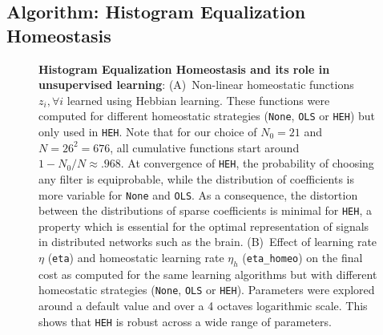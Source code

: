 \documentclass[vision,article,submit,oneauthor,pdftex]{Definitions/mdpi}
\newcommand{\seeFig}[1]{Figure~\ref{fig:#1}}%
\begin{document}
\subsection{Algorithm: Histogram Equalization Homeostasis}\label{HEH}
\begin{figure}%
\caption{
{\bf Histogram Equalization Homeostasis and its role in unsupervised learning}:
{\sf (A)}~Non-linear homeostatic functions $z_i, \forall i$ learned using Hebbian learning. These functions were computed for different homeostatic strategies (\texttt{None}, \texttt{OLS} or \texttt{HEH}) but only used in \texttt{HEH}. Note that for our choice of $N_0=21$ and $N=26^2=676$, all cumulative functions start around $1 - N_0/N \approx .968 $. At convergence of \texttt{HEH}, the probability of choosing any filter is equiprobable, while the distribution of coefficients is more variable for \texttt{None} and \texttt{OLS}. As a consequence, the distortion between the distributions of sparse coefficients is minimal for \texttt{HEH}, a property which is essential for the optimal representation of signals in distributed networks such as the brain. %
{\sf (B)}~Effect of learning rate $\eta$ (\texttt{eta}) and homeostatic learning rate $\eta_h$ (\texttt{eta\_homeo}) on the final cost as computed for the same learning algorithms but with different homeostatic strategies (\texttt{None}, \texttt{OLS} or \texttt{HEH}). Parameters were explored around a default value and over a 4 octaves logarithmic scale. This shows that \texttt{HEH} is robust across a wide range of parameters.
}
\end{figure}
\end{document}
